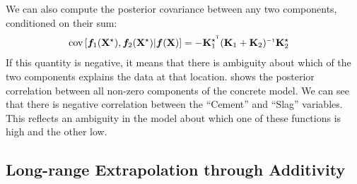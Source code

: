 We can also compute the posterior covariance between any two components, conditioned on their sum:
%
\begin{align}
\covargs{ \vf_1(\vX^\star)}{\vf_2(\vX^\star) | \vf(\vX) } 
& = - \vK_1^{\star\tra} (\vK_1 + \vK_2)\inv \vK_2^\star
\label{eq:post-component-cov}
\end{align}
%
If this quantity is negative, it means that there is ambiguity about which of the two components explains the data at that location.
 shows the posterior correlation between all non-zero components of the concrete model.
We can see that there is negative correlation between the ``Cement'' and ``Slag'' variables.
This reflects an ambiguity in the model about which one of these functions is high and the other low.







\subsection{Long-range Extrapolation through Additivity}
\label{sec:additivity-extrapolation}

